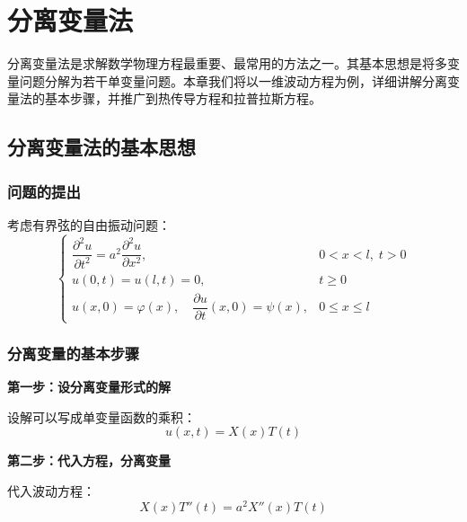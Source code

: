
\chapter{分离变量法}

\begin{wulibj}[本章导读]
分离变量法是求解数学物理方程最重要、最常用的方法之一。其基本思想是将多变量问题分解为若干单变量问题。本章我们将以一维波动方程为例，详细讲解分离变量法的基本步骤，并推广到热传导方程和拉普拉斯方程。
\end{wulibj}

\section{分离变量法的基本思想}

\subsection{问题的提出}

考虑有界弦的自由振动问题：
\begin{equation}
    \begin{cases}
        \dfrac{\partial^2 u}{\partial t^2} = a^2\dfrac{\partial^2 u}{\partial x^2}, & 0 < x < l, \; t > 0 \\
        u(0, t) = u(l, t) = 0, & t \geq 0 \\
        u(x, 0) = \varphi(x), \quad \dfrac{\partial u}{\partial t}(x, 0) = \psi(x), & 0 \leq x \leq l
    \end{cases}
\end{equation}

\subsection{分离变量的基本步骤}

\textbf{第一步：设分离变量形式的解}

设解可以写成单变量函数的乘积：
\begin{equation}
    u(x, t) = X(x)T(t)
\end{equation}

\textbf{第二步：代入方程，分离变量}

代入波动方程：
\begin{equation}
    X(x)T''(t) = a^2 X''(x)T(t)
\end{equation}

